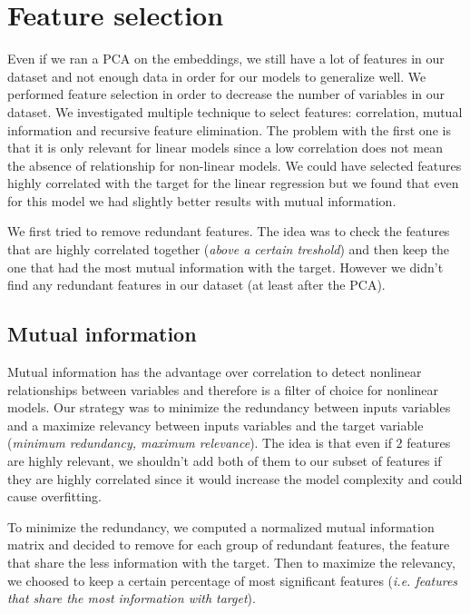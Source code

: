 \section{Feature selection}

Even if we ran a PCA on the embeddings, we still have a lot of features in our dataset and not enough data in order for our models to generalize well. We performed feature selection in order to decrease the number of variables in our dataset. We investigated multiple technique to select features: correlation, mutual information and recursive feature elimination. The problem with the first one is that it is only relevant for linear models since a low correlation does not mean the absence of relationship for non-linear models. We could have selected features highly correlated with the target for the linear regression but we found that even for this model we had slightly better results with mutual information.

We first tried to remove redundant features. The idea was to check the features that are highly correlated together (\textit{above a certain treshold}) and then keep the one that had the most mutual information with the target. However we didn't find any redundant features in our dataset (at least after the PCA).

\subsection{Mutual information}

Mutual information has the advantage over correlation to detect nonlinear relationships between variables and therefore is a filter of choice for nonlinear models. Our strategy was to minimize the redundancy between inputs variables and a maximize relevancy between inputs variables and the target variable (\textit{minimum redundancy, maximum relevance}). The idea is that even if $2$ features are highly relevant, we shouldn't add both of them to our subset of features if they are highly correlated since it would increase the model complexity and could cause overfitting.

To minimize the redundancy, we computed a normalized mutual information matrix and decided to remove for each group of redundant features, the feature that share the less information with the target.
Then to maximize the relevancy, we choosed to keep a certain percentage of most significant features (\textit{i.e. features that share the most information with target}).

